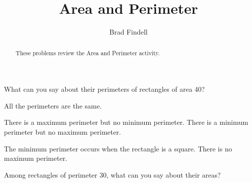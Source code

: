\documentclass[nooutcomes]{ximera}
\title{Area and Perimeter}
\author{Brad Findell}
\begin{document}
\begin{abstract}
These problems review the Area and Perimeter activity.  
\end{abstract}
\maketitle

What can you say about their perimeters of rectangles of area 40?   

All the perimeters are the same. 

There is a maximum perimeter but no minimum perimeter.  
There is a minimum perimeter but no maximum perimeter. 

The minimum perimeter occurs when the rectangle is a square.  
There is no maximum perimeter.  

Among rectangles of perimeter 30, what can you say about their areas?  
\end{document}
